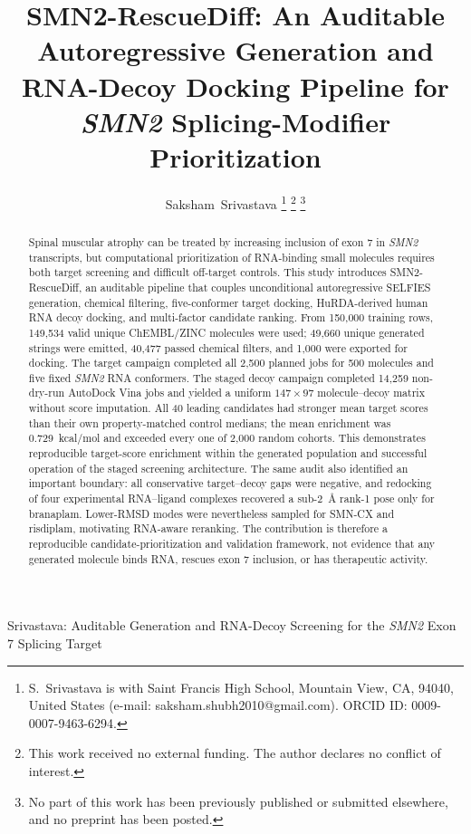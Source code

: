 \documentclass[journal]{IEEEtran}
\begin{document}
\title{SMN2-RescueDiff: An Auditable Autoregressive Generation and RNA-Decoy Docking Pipeline for \textit{SMN2} Splicing-Modifier Prioritization}

\author{Saksham~Srivastava%
\thanks{S.~Srivastava is with Saint Francis High School, Mountain View,
CA, 94040, United States (e-mail: saksham.shubh2010@gmail.com).
ORCID ID: \mbox{0009-0007-9463-6294}.}%
\thanks{This work received no external funding. The author declares no
conflict of interest.}%
\thanks{No part of this work has been previously published or submitted
elsewhere, and no preprint has been posted.}}

%
{Srivastava: Auditable Generation and RNA-Decoy Screening for the
\textit{SMN2} Exon 7 Splicing Target}

\maketitle

\begin{abstract}
Spinal muscular atrophy can be treated by increasing inclusion of exon
7 in \textit{SMN2} transcripts, but computational prioritization of
RNA-binding small molecules requires both target screening and difficult
off-target controls. This study introduces SMN2-RescueDiff, an auditable
pipeline that couples unconditional autoregressive SELFIES generation,
chemical filtering, five-conformer target docking, HuRDA-derived human
RNA decoy docking, and multi-factor candidate ranking. From 150{,}000
training rows, 149{,}534 valid unique ChEMBL/ZINC molecules were used;
49{,}660 unique generated strings were emitted, 40{,}477 passed chemical
filters, and 1{,}000 were exported for docking. The target campaign
completed all 2{,}500 planned jobs for 500 molecules and five fixed
\textit{SMN2} RNA conformers. The staged decoy campaign completed
14{,}259 non-dry-run AutoDock Vina jobs and yielded a uniform
$147\times97$ molecule--decoy matrix without score imputation. All 40
leading candidates had stronger mean target scores than their own
property-matched control medians; the mean enrichment was
0.729~kcal/mol and exceeded every one of 2{,}000 random cohorts. This
demonstrates reproducible target-score enrichment within the generated
population and successful operation of the staged screening
architecture. The same audit also identified an important boundary:
all conservative target--decoy gaps were negative, and redocking of four
experimental RNA--ligand complexes recovered a sub-2~\AA{} rank-1 pose
only for branaplam. Lower-RMSD modes were nevertheless sampled for
SMN-CX and risdiplam, motivating RNA-aware reranking. The contribution
is therefore a reproducible candidate-prioritization and validation
framework, not evidence that any generated molecule binds RNA, rescues
exon 7 inclusion, or has therapeutic activity.
\end{abstract}
\end{document}
